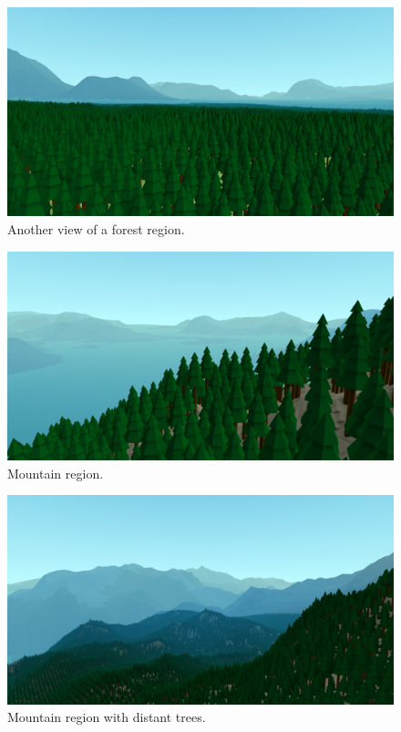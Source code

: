 \begin{figure}
	\centering
		\includegraphics[width=1.0\textwidth]{figures/Screenshot000001.jpg}
	\caption{Another view of a forest region.}
	\label{fig:screenshot01}
\end{figure}

\begin{figure}
	\centering
		\includegraphics[width=1.0\textwidth]{figures/Screenshot000002.jpg}
	\caption{Mountain region.}
	\label{fig:screenshot02}
\end{figure}

\begin{figure}
	\centering
		\includegraphics[width=1.0\textwidth]{figures/Screenshot000003.jpg}
	\caption{Mountain region with distant trees.}
	\label{fig:screenshot03}
\end{figure}

